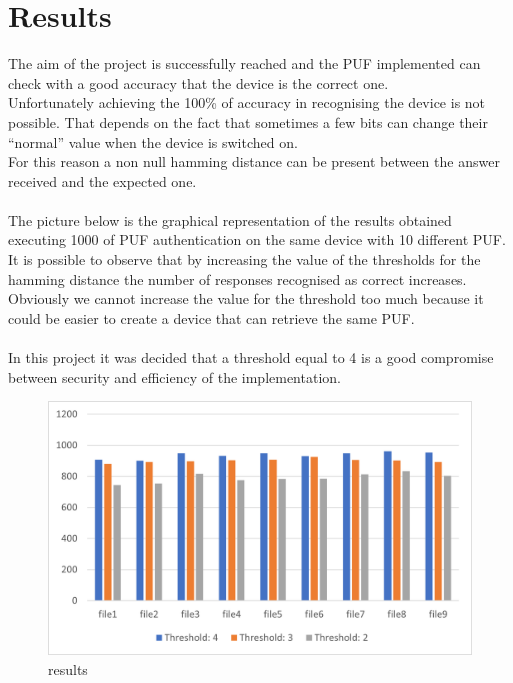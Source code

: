 \chapter{Results}

The aim of the project is successfully reached and the PUF implemented can check with a good accuracy that the device is the correct one.
\\
Unfortunately achieving the 100\% of accuracy in recognising the device is not possible. That depends on the fact that sometimes a few bits can change their ``normal'' value when the device is switched on.
\\
For this reason a non null hamming distance can be present between the answer received and the expected one.
\\
\\
The picture below is the graphical representation of the results obtained executing 1000 of PUF authentication on the same device with 10 different PUF.
\\
It is possible to observe that by increasing the value of the thresholds for the hamming distance the number of responses recognised as correct increases.
\\
Obviously we cannot increase the value for the threshold too much because it could be easier to create a device that can retrieve the same PUF.
\\
\\
In this project it was decided that a threshold equal to 4 is a good compromise between security and efficiency of the implementation.

\begin{figure}[H]
\vspace{0.5cm}
\includegraphics[width=\textwidth]{images/results.png}
\caption{results }
\label{fig:results} %
\end{figure}


